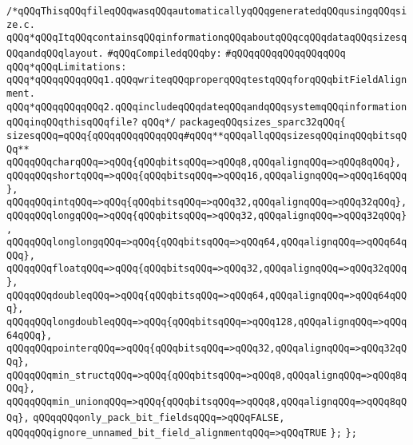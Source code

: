 \label{src/app/c-glue-maker/sizes-sparc32.pkg}
\verb|/*qQQqThisqQQqfileqQQqwasqQQqautomaticallyqQQqgeneratedqQQqusingqQQqsize.c.|\newline
\verb|qQQq*qQQqItqQQqcontainsqQQqinformationqQQqaboutqQQqcqQQqdataqQQqsizesqQQqandqQQqlayout.|\newline
\newline
\verb|#qQQqCompiledqQQqby:|\newline
\verb|#qQQqqQQqqQQqqQQqqQQq|\newline
\newline
\verb|qQQq*qQQqLimitations:|\newline
\verb|qQQq*qQQqqQQqqQQq1.qQQqwriteqQQqproperqQQqtestqQQqforqQQqbitFieldAlignment.|\newline
\verb|qQQq*qQQqqQQqqQQq2.qQQqincludeqQQqdateqQQqandqQQqsystemqQQqinformationqQQqinqQQqthisqQQqfile?|\newline
\verb|qQQq*/|\newline
\newline
\verb|packageqQQqsizes_sparc32qQQq{|\newline
\verb|sizesqQQq=qQQq{qQQqqQQqqQQqqQQq#qQQq**qQQqallqQQqsizesqQQqinqQQqbitsqQQq**|\newline
\verb|qQQqqQQqcharqQQq=>qQQq{qQQqbitsqQQq=>qQQq8,qQQqalignqQQq=>qQQq8qQQq},|\newline
\verb|qQQqqQQqshortqQQq=>qQQq{qQQqbitsqQQq=>qQQq16,qQQqalignqQQq=>qQQq16qQQq},|\newline
\verb|qQQqqQQqintqQQq=>qQQq{qQQqbitsqQQq=>qQQq32,qQQqalignqQQq=>qQQq32qQQq},|\newline
\verb|qQQqqQQqlongqQQq=>qQQq{qQQqbitsqQQq=>qQQq32,qQQqalignqQQq=>qQQq32qQQq},|\newline
\verb|qQQqqQQqlonglongqQQq=>qQQq{qQQqbitsqQQq=>qQQq64,qQQqalignqQQq=>qQQq64qQQq},|\newline
\verb|qQQqqQQqfloatqQQq=>qQQq{qQQqbitsqQQq=>qQQq32,qQQqalignqQQq=>qQQq32qQQq},|\newline
\verb|qQQqqQQqdoubleqQQq=>qQQq{qQQqbitsqQQq=>qQQq64,qQQqalignqQQq=>qQQq64qQQq},|\newline
\verb|qQQqqQQqlongdoubleqQQq=>qQQq{qQQqbitsqQQq=>qQQq128,qQQqalignqQQq=>qQQq64qQQq},|\newline
\verb|qQQqqQQqpointerqQQq=>qQQq{qQQqbitsqQQq=>qQQq32,qQQqalignqQQq=>qQQq32qQQq},|\newline
\verb|qQQqqQQqmin_structqQQq=>qQQq{qQQqbitsqQQq=>qQQq8,qQQqalignqQQq=>qQQq8qQQq},|\newline
\verb|qQQqqQQqmin_unionqQQq=>qQQq{qQQqbitsqQQq=>qQQq8,qQQqalignqQQq=>qQQq8qQQq},|\newline
\verb|qQQqqQQqonly_pack_bit_fieldsqQQq=>qQQqFALSE,|\newline
\verb|qQQqqQQqignore_unnamed_bit_field_alignmentqQQq=>qQQqTRUE|\newline
\verb|};|\newline
\verb|};|\newline

